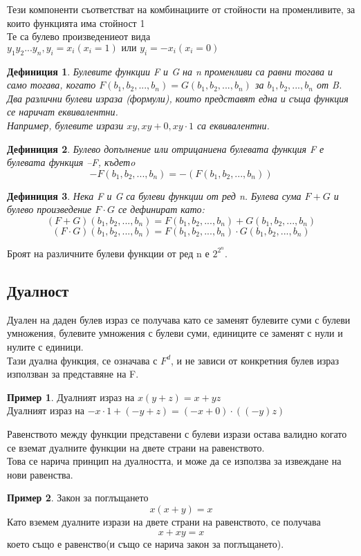 \documentclass[fleqn, 12pt]{article}
\newtheorem{definition}{Дефиниция}[subsection]
\theoremstyle{definition}
\newtheorem{example}{Пример}[subsection]
\begin{document}
Тези компоненти съответстват на комбинациите от стойности на променливите, за които функцията има стойност 1\\
Те са булево произведениеот вида $y_1y_2...y_n,y_i= x_i (x_i=1) \text{ или }y_i= -x_i(x_i=0)$
\begin{definition}
Булевите функции F и G на n променливи са равни тогава и само тогава, когато $F(b_1, b_2, ..., b_n) = G(b_1, b_2, ..., b_n)$ за $b_1, b_2, ..., b_n$ от B.\\
Два различни булеви израза (формули), които представят една и съща функция се наричат еквивалентни.\\
Например, булевите изрази $xy , xy + 0 ,xy \cdot1$ са еквивалентни.
\end{definition}
\begin{definition}
Булево допълнение или отрицаниена булевата функция F е булевата функция –F, къдетo
$$-F(b_1, b_2, ..., b_n) = -(F(b_1, b_2, ..., b_n))$$
\end{definition}
\begin{definition}
Нека F и G са булеви функции от ред n. Булева сума $F+G$ и булево произведение $F \cdot G$ се дефинират като:
$$(F+G)(b_1, b_2, ..., b_n) = F(b_1, b_2, ..., b_n) + G(b_1, b_2, ..., b_n)$$
$$(F \cdot G)(b_1, b_2, ..., b_n) = F(b_1, b_2, ..., b_n) \cdot G(b_1, b_2, ..., b_n)$$
\end{definition}
Броят на различните булеви функции от ред n е $2^{2^n}$.

\subsection{Дуалност}
Дуален на даден булев израз се получава като се заменят булевите суми с булеви умножения, булевите умножения с булеви суми, единиците се заменят с нули и нулите с единици. \\
Тази дуална функция, се означава с $F^d$, и не зависи от конкретния булев израз използван за представяне на F.
\begin{example}
Дуалният израз на $x(y+z) = x + yz$\\
Дуалният израз на $-x\cdot1 + (-y+z) = (-x + 0) \cdot ((-y)z)$
\end{example}
Равенството между функции представени с булеви изрази остава валидно когато се вземат дуалните функции на двете страни на равенството.\\
Това се нарича принцип на дуалността, и може да се използва за извеждане на нови равенства.
\begin{example}
Закон за поглъщането\\
$$x(x+y) = x$$
Като вземем дуалните изрази на двете страни на равенството, се получава 
$$x + xy = x$$
което също е равенство(и също се нарича закон за поглъщането).
\end{example}
\end{document}
